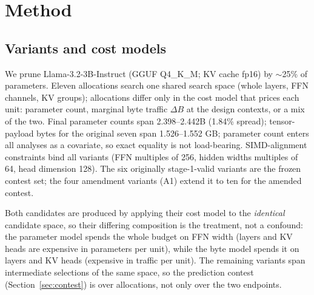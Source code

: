\documentclass[10pt,letterpaper,twocolumn]{article}
\begin{document}
\section{Method}
\subsection{Variants and cost models}
We prune Llama-3.2-3B-Instruct (GGUF Q4\_K\_M; KV cache fp16) by
$\sim$25\% of parameters. Eleven allocations search one shared
search space (whole layers, FFN channels, KV groups); allocations
differ only in the cost model that prices each unit: parameter
count, marginal byte traffic $\Delta B$ at the design contexts, or
a mix of the two. Final parameter counts span 2.398--2.442B
(1.84\% spread); tensor-payload bytes for the original seven span
1.526--1.552 GB; parameter count enters all analyses as a
covariate, so exact equality is not load-bearing.
SIMD-alignment constraints bind all variants (FFN multiples of
256, hidden widths multiples of 64, head dimension 128). The six
originally stage-1-valid variants are the frozen contest set; the four amendment
variants (A1) extend it to ten for the amended contest.

Both candidates are produced by applying their cost model to the
\emph{identical} candidate space, so their differing composition
is the treatment, not a confound: the parameter model spends the
whole budget on FFN width (layers and KV heads are expensive in
parameters per unit), while the byte model spends it on layers
and KV heads (expensive in traffic per unit). The remaining
variants span intermediate selections of the same space, so the
prediction contest (Section~\ref{sec:contest}) is over
allocations, not only over the two endpoints.
\end{document}
